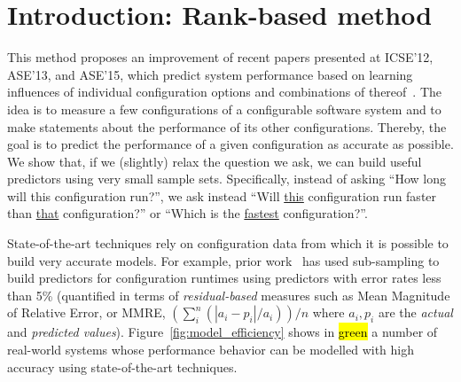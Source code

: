 \documentclass[sigconf]{acmart}
\DeclareRobustCommand{\hlgreen}[1]{{\sethlcolor{Mygreen}\textcolor{white}{\hl{#1}}}}
\begin{document}
\section{Introduction: Rank-based method}
This method proposes an improvement of recent papers presented at ICSE'12, ASE'13, and ASE'15, which predict system performance based on learning influences of individual configuration options and combinations of thereof~\cite{siegmund2012predicting,guo2013variability,sarkar2015cost}. The idea is to measure a few configurations of a configurable software system and to make statements about the performance of its other configurations. Thereby, the goal is to predict the performance of a given configuration as accurate as possible.
We show that, if we (slightly) relax the
question we ask, we can build useful predictors using very small sample sets. Specifically,
instead of asking ``How long will this configuration run?'', we
ask instead ``Will \underline{this} configuration run faster than \underline{that} configuration?'' or ``Which is the \underline{fastest} configuration?''. 

State-of-the-art techniques rely on configuration data from which it is possible to build very accurate models. For example, prior work~\cite{nair2017faster} has used sub-sampling to build predictors for configuration runtimes using predictors with error
rates less than 5\% (quantified in terms of \emph{residual-based} measures such as Mean Magnitude of Relative Error, or  MMRE, $(\sum_i^n  (|a_i - p_i|/a_i))/n$ where $a_i,p_i$ are the
{\em actual} and {\em predicted values}).
Figure~\ref{fig:model_efficiency} shows in \hlgreen{green} a number of real-world systems 
whose performance behavior can be modelled with high accuracy using state-of-the-art techniques.
\end{document}

